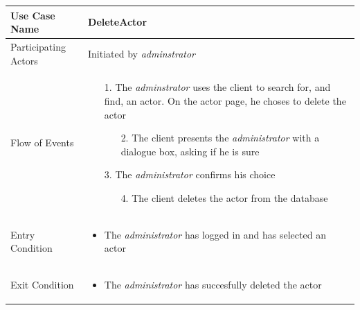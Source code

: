 \begin{center}
	\begin{tabular}{ | l | p{10cm} |  }
		\hline
		Use Case Name & DeleteActor \\ \hline
		Participating Actors & Initiated by \emph{adminstrator} \\ \hline
		Flow of Events & \begin{enumerate}
						\item[1.] The \emph{adminstrator} uses the client to search for, and find, an actor. On the actor page, he choses to delete the actor
						\begin{enumerate}
							\item[2.] The client presents the \emph{administrator} with a dialogue box, asking if he is sure
						\end{enumerate}
						\item[3.] The \emph{administrator} confirms his choice
						\begin{enumerate}
							\item[4.] The client deletes the actor from the database
						\end{enumerate}
					\end{enumerate} \\ \hline
		Entry Condition & \begin{itemize}
						\item The \emph{administrator} has logged in and has selected an actor
					\end{itemize} \\ \hline
		Exit Condition & \begin{itemize}
						\item The \emph{administrator} has succesfully deleted the actor
					\end{itemize} \\
		\hline
	\end{tabular}
\end{center}

